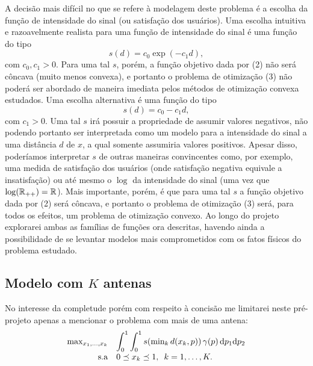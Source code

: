 \documentclass[a4paper,12pt]{article}
\begin{document}
A decisão mais difícil no que se refere à modelagem deste problema é a escolha da função de intensidade do sinal (ou satisfação dos usuários). Uma escolha intuitiva e razoavelmente realista para uma função de intensidade do sinal é uma função do tipo 
\begin{equation}
	s(d) = c_0\exp(-c_1d),
\end{equation}
com $c_0, c_1 > 0$. Para uma tal $s$, porém, a função objetivo dada por (2) não será côncava (muito menos convexa), e portanto o problema de otimização (3) não poderá ser abordado de maneira imediata pelos métodos de otimização convexa estudados. Uma escolha alternativa é uma função do tipo 
\begin{equation}
	s(d) = c_0 - c_1d,
\end{equation}
com $c_1 > 0$. Uma tal $s$ irá possuir a propriedade de assumir valores negativos, não podendo portanto ser interpretada como um modelo para a intensidade do sinal a uma distância $d$ de $x$, a qual somente assumiria valores positivos. Apesar disso, poderíamos interpretar $s$ de outras maneiras convincentes como, por exemplo, uma medida de satisfação dos usuários (onde satisfação negativa equivale a insatisfação) ou até mesmo o $\log$ da intensidade do sinal (uma vez que $\log(\mathbb{R}_{++}) = \mathbb{R}$). Mais importante, porém, é que para uma tal $s$ a função objetivo dada por (2) será côncava, e portanto o problema de otimização (3) será, para todos os efeitos, um problema de otimização convexo. Ao longo do projeto explorarei ambas as famílias de funções ora descritas, havendo ainda a possibilidade de se levantar modelos mais comprometidos com os fatos físicos do problema estudado.

\subsection{Modelo com $K$ antenas}

No interesse da completude porém com respeito à concisão me limitarei neste pré-projeto apenas a mencionar o problema com mais de uma antena:
\begin{equation}
	\label{problema}
	\begin{array}{rl}
		\max_{x_1,\dots,x_k} & {\displaystyle \int_0^1\int_0^1 s(\text{min}_k \, d(x_k,p)) \, \g(p) \, \text{d}p_1\text{d}p_2} \\[1.5ex] %
		\text{s.a} & 0 \preceq x_k \preceq 1, \,\,\, k = 1, \dots, K .
	\end{array}
\end{equation}
\end{document}
